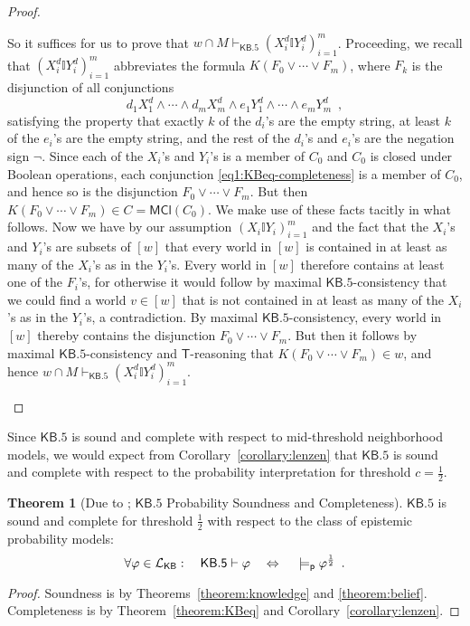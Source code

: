 \documentclass[12pt]{article}
\theoremstyle{definition}
\newtheorem{theorem}{Theorem}[section]
\newcommand{\Lang}{{\cal L}}   %
\newcommand{\KB}{{\mathsf{KB}}}                 %
\newcommand{\KBeq}{{\mathsf{KB.5}}}             %
\newcommand{\MCl}{\mathsf{MCl}}                   %
\newcommand{\modelsp}{\models_{\mathsf{p}}}                  %
\begin{document}
\begin{proof}
\begin{description}
    So it suffices for us to prove that
    $w\cap M\vdash_\KBeq (X_i^d\mathbb{I}Y_i^d)_{i=1}^m$. Proceeding,
    we recall that $(X_i^d\mathbb{I}Y_i^d)_{i=1}^m$ abbreviates the
    formula $K(F_0\lor\cdots\lor F_m)$, where $F_k$ is the disjunction
    of all conjunctions
    \begin{equation}
      d_1X_1^d\land\cdots\land d_mX_m^d\land e_1Y_1^d\land\cdots\land
      e_mY_m^d\enspace,
      \label{eq1:KBeq-completeness}
    \end{equation}
    satisfying the property that exactly $k$ of the $d_i$'s are the
    empty string, at least $k$ of the $e_i$'s are the empty string,
    and the rest of the $d_i$'s and $e_i$'s are the negation sign
    $\lnot$. Since each of the $X_i$'s and $Y_i$'s is a member of
    $C_0$ and $C_0$ is closed under Boolean operations, each
    conjunction \eqref{eq1:KBeq-completeness} is a member of $C_0$,
    and hence so is the disjunction $F_0\lor\cdots\lor F_m$.  But then
    $K(F_0\lor\cdots\lor F_m)\in C=\MCl(C_0)$. We make use of these
    facts tacitly in what follows.  Now we have by our assumption
    $(X_i\mathbb{I}Y_i)_{i=1}^m$ and the fact that the $X_i$'s and
    $Y_i$'s are subsets of $[w]$ that every world in $[w]$ is
    contained in at least as many of the $X_i$'s as in the $Y_i$'s.
    Every world in $[w]$ therefore contains at least one of the
    $F_i$'s, for otherwise it would follow by maximal
    $\KBeq$-consistency that we could find a world $v\in[w]$ that is
    not contained in at least as many of the $X_i$'s as in the
    $Y_i$'s, a contradiction.  By maximal $\KBeq$-consistency, every
    world in $[w]$ thereby contains the disjunction
    $F_0\lor\cdots\lor F_m$.  But then it follows by maximal
    $\KBeq$-consistency and $\mathsf{T}$-reasoning that
    $K(F_0\lor\cdots\lor F_m)\in w$, and hence
    $w\cap M\vdash_\KBeq (X_i^d\mathbb{I}Y_i^d)_{i=1}^m$.  \qedhere
  \end{description}
\end{proof}

Since $\KBeq$ is sound and complete with respect to mid-threshold
neighborhood models, we would expect from
Corollary~\ref{corollary:lenzen} that $\KBeq$ is sound and complete
with respect to the probability interpretation for threshold $c=\frac
12$.

\begin{theorem}[Due to \cite{Lenzen1980:gwuw}; $\KBeq$
  Probability Soundness and Completeness]
  $\KBeq$ is sound and complete for threshold $\frac12$ with respect
  to the class of epistemic probability models:
  \[
  \textstyle 
  \forall\varphi\in\Lang_\KB:\quad
  \KBeq\vdash\varphi
   \quad\Leftrightarrow\quad
  {}\modelsp\varphi^{\frac 12} \enspace.
  \]
\end{theorem}
\begin{proof}
  Soundness is by Theorems~\ref{theorem:knowledge} and
  \ref{theorem:belief}.  Completeness is by Theorem~\ref{theorem:KBeq}
  and Corollary~\ref{corollary:lenzen}.
\end{proof}
\end{document}
